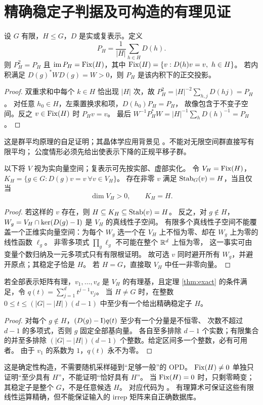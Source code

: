 \section{精确稳定子判据及可构造的有理见证}\label{sec:stabilizer}
\begin{theorem}[Reynolds 投影]
设 $G$ 有限，$H\leq G$，$D$ 是实或复表示。定义
\[
 P_H=\frac1{|H|}\sum_{h\in H}D(h).
\]
则 $P_H^2=P_H$ 且 $\operatorname{im} P_H=\operatorname{Fix}(H)$，其中
$\operatorname{Fix}(H)=\{v:D(h)v=v,\ h\in H\}$。
若内积满足 $D(g)^*WD(g)=W>0$，则 $P_H$ 是该内积下的正交投影。
\end{theorem}
\begin{proof}
双重求和中每个 $k\in H$ 恰出现 $|H|$ 次，故
$P_H^2=|H|^{-2}\sum_{h,j}D(hj)=P_H$。
对任意 $h_0\in H$，左乘置换求和项，$D(h_0)P_H=P_H$，
故像包含于不变子空间。反之 $v\in\operatorname{Fix}(H)$ 时 $P_Hv=v$。
最后 $W^{-1}P_H^*W=|H|^{-1}\sum_hD(h)^{-1}=P_H$。
\end{proof}
这是群平均原理的自足证明；其晶体学应用背景见
\citet{Hatch2002,Stokes2017}。不能对无限空间群直接写有限平均；
公度情形必须先给出使表示下降的正规平移子群。

\begin{theorem}[非零精确稳定子的充要条件]\label{thm:exact}
以下将 $V$ 视为实向量空间；复表示可先按实部、虚部实化。
令 $V_H=\operatorname{Fix}(H)$，$K_H=\{g\in G:D(g)v=v\ \forall v\in V_H\}$。
存在非零 $v$ 满足 $\operatorname{Stab}_G(v)=H$，当且仅当
\[
 \dim V_H>0,\qquad K_H=H.
\]
\end{theorem}
\begin{proof}
若这样的 $v$ 存在，则 $H\subseteq K_H\subseteq\operatorname{Stab}(v)=H$。
反之，对 $g\notin H$，$W_g=V_H\cap\ker(D(g)-\mathrm I)$ 是 $V_H$ 的真线性子空间。
有限多个真线性子空间不能覆盖一个正维实向量空间：为每个 $W_g$ 选一个在
$V_H$ 上不恒为零、却在 $W_g$ 上为零的线性函数 $\ell_g$。
非零多项式 $\prod_g\ell_g$ 不可能在整个 $\mathbb R^d$ 上恒为零，
这一事实可由变量个数归纳及一元多项式只有有限根证明。
故可选 $v$ 同时避开所有 $W_g$，并避开原点；其稳定子恰是 $H$。
若 $H=G$，直接取 $V_H$ 中任一非零向量。
\end{proof}

\begin{proposition}[有限整数参数给出有理见证]\label{prop:witness}
若全部表示矩阵有理，$v_1,\ldots,v_d$ 是 $V_H$ 的有理基，且定理
\ref{thm:exact} 的条件满足，令
$q(t)=\sum_{j=1}^d t^{j-1}v_j$。
当 $H\ne G$ 时，在整数
$0\leq t\leq (|G|-|H|)(d-1)$ 中至少有一个给出精确稳定子 $H$。
\end{proposition}
\begin{proof}
对每个 $g\notin H$，$(D(g)-\mathrm I)q(t)$ 至少有一个分量是不恒零、
次数不超过 $d-1$ 的多项式，否则 $g$ 固定全部基向量。
各自至多排除 $d-1$ 个实数；有限集合的并至多排除
$(|G|-|H|)(d-1)$ 个整数。给定区间多一个整数，必有可用者。
由于 $v_1$ 的系数为 $1$，$q(t)$ 永不为零。
\end{proof}
这是确定性构造，不需要随机采样碰到“足够一般”的 OPD。
$\operatorname{Fix}(H)\ne0$ 单独只证明“至少具有 $H$”，不能证明“恰好具有 $H$”。
当 $\operatorname{Fix}(H)=0$ 时，只剩零畸变；其稳定子是整个 $G$，不是任意候选 $H$。
对应代码为 。
有理算术可保证这些有限线性运算精确，但不能保证输入的 irrep 矩阵来自正确数据库。


